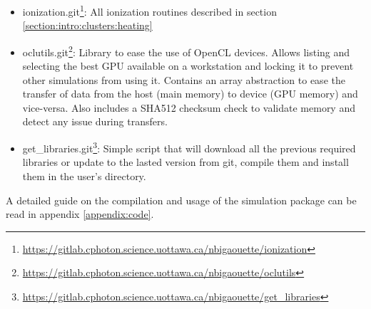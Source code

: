 \begin{itemize}
\item ionization.git\footnote{ \url{
    https://gitlab.cphoton.science.uottawa.ca/nbigaouette/ionization}}:
    All ionization routines described in section
    \ref{section:intro:clusters:heating}
\item oclutils.git\footnote{ \url{
    https://gitlab.cphoton.science.uottawa.ca/nbigaouette/oclutils}}:
    Library to ease the use of OpenCL devices. Allows listing and selecting the
    best GPU available on a workstation and locking it to prevent
    other simulations from using it. Contains an array abstraction to ease the
    transfer of data from the host (main memory) to device (GPU memory) and
    vice-versa. Also includes a SHA512 checksum check to validate memory
    and detect any issue during transfers.
\item get\_libraries.git\footnote{ \url{
    https://gitlab.cphoton.science.uottawa.ca/nbigaouette/get_libraries}}:
    Simple script that will download all the previous required libraries or
    update to the lasted version from git, compile them and install them in the
    user's directory.
\end{itemize}
A detailed guide on the compilation and usage of the simulation package can be
read in appendix \ref{appendix:code}.

